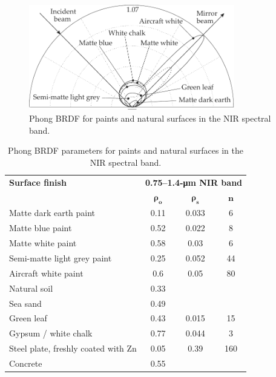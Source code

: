 
\begin{figure}[tb]
\centering
\includegraphics[width=0.8\textwidth]{pic/specref1.pdf}
\caption{Phong BRDF for paints and natural surfaces in the NIR spectral band.
\label{specref1}}
\end{figure}


\begin{table}[tb]
\centering
\caption{Phong BRDF parameters for paints and natural surfaces in the NIR spectral band.\label{brdftab}}
{\small
\begin{tabular}{|l|c|c|c|}
\hline
\textbf{Surface finish} &\multicolumn{3}{c|}{\textbf{0.75--1.4-\si{\micro\metre}{} NIR band}} \\
\cline{2-4}
 & $\bm{ \rho_o}$& $\bm{\rho_s}$ & $\bm{n}$ \\
\hline
Matte dark earth paint & 0.11 & 0.033 & 6\\
Matte blue paint & 0.52 & 0.022 & 8\\
Matte white paint & 0.58 & 0.03 & 6\\
Semi-matte light grey paint & 0.25 & 0.052 & 44\\
Aircraft white paint & 0.6 & 0.05 & 80 \\
\hline
Natural soil & 0.33 & & \\
Sea sand & 0.49 && \\
Green leaf & 0.43 & 0.015 & 15\\
Gypsum / white chalk & 0.77 & 0.044 & 3\\
Steel plate, freshly coated with Zn& 0.05 & 0.39 & 160\\
Concrete & 0.55 & & \\
\hline
\end{tabular}
}
\end{table}

